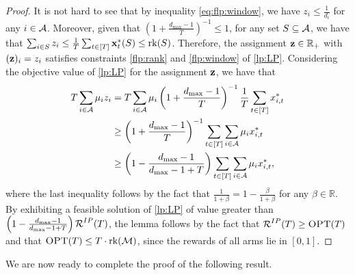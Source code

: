 \begin{proof}
It is not hard to see that by inequality \eqref{eq:flp:window}, we have $z_{i} \leq \frac{1}{d_i}$ for any $i \in \operatorname{\mathcal{A}}$. Moreover, given that $\left(1 + \frac{d_{\max}-1}{T}\right)^{-1} \leq 1$, for any set $S \subseteq \operatorname{\mathcal{A}}$, we have that $\sum_{i \in S} z_i \leq \frac{1}{T}\sum_{t \in [T]} \operatorname{\mathbf{x}}^*_t(S) \leq \operatorname{rk}(S)$. Therefore, the assignment $\operatorname{\mathbf{z}} \in \mathbb{R}_{+}$ with $(\operatorname{\mathbf{z}})_i = z_i$ satisfies constraints \eqref{flp:rank} and \eqref{flp:window} of \eqref{lp:LP}. Considering the objective value of \eqref{lp:LP} for the assignment $\operatorname{\mathbf{z}}$, we have that
\begin{align*}
    T \sum_{i \in \operatorname{\mathcal{A}}} \mu_i z_i &= T  \sum_{i \in \operatorname{\mathcal{A}}} \mu_i \left(1 + \frac{d_{\max}-1}{T}\right)^{-1} \frac{1}{T} \sum_{t \in [T]} x^*_{i,t} \\
    &\geq \left(1 + \frac{d_{\max}-1}{T}\right)^{-1} \sum_{t \in [T]} \sum_{i \in \operatorname{\mathcal{A}}} \mu_i x^*_{i,t}\\
    &\geq \left(1 - \frac{d_{\max}-1}{d_{\max}-1 + T}\right) \sum_{t \in [T]} \sum_{i \in \operatorname{\mathcal{A}}} \mu_i x^*_{i,t},
\end{align*}
where the last inequality follows by the fact that $\frac{1}{1+\beta} = 1 - \frac{\beta}{1+ \beta}$ for any $\beta \in \mathbb{R}$.
By exhibiting a feasible solution of \eqref{lp:LP} of value greater than $\left(1 - \frac{d_{\max}-1}{d_{\max}-1 + T}\right) \operatorname{\mathcal{R}}^{IP}(T)$, the lemma follows by the fact that $\operatorname{\mathcal{R}}^{IP}(T) \geq \textsc{OPT}(T)$ and that $\textsc{OPT}(T) \leq T \cdot \operatorname{rk}(\operatorname{\mathcal{M}})$, since the rewards of all arms lie in $[0,1]$.
\end{proof}

We are now ready to complete the proof of the following result.

\restateinterleavedGreedy*

